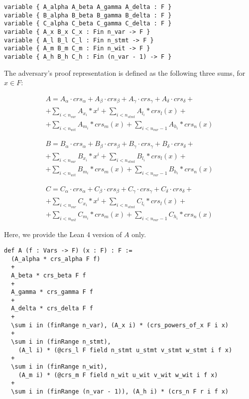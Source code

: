 \documentclass{article}
\theoremstyle{definition}
\theoremstyle{remark}
\begin{document}
\begin{lstlisting}
variable { A_alpha A_beta A_gamma A_delta : F }
variable { B_alpha B_beta B_gamma B_delta : F }
variable { C_alpha C_beta C_gamma C_delta : F }
variable { A_x B_x C_x : Fin n_var -> F }
variable { A_l B_l C_l : Fin n_stmt -> F }
variable { A_m B_m C_m : Fin n_wit -> F }
variable { A_h B_h C_h : Fin (n_var - 1) -> F }
\end{lstlisting}

The adversary's proof representation is defined as the following three sums, for $x \in F$:

\begin{multline}
A = A_{\alpha} \cdot crs_{\alpha} + A_{\beta} \cdot crs_{\beta} + A_{\gamma} \cdot crs_{\gamma} + A_{\delta} \cdot crs_{\delta} + \\
    + \sum \limits_{i < n_{var}} A_{x_i} * x^i + \sum \limits_{i < n_{stmt}} A_{l_i} * crs_l(x) + \\
    + \sum \limits_{i < n_{wit}} A_{m_i} * crs_m(x) + \sum \limits_{i < n_{var} - 1} A_{h_i} * crs_n(x)
\end{multline}

\begin{multline}
B = B_{\alpha} \cdot crs_{\alpha} + B_{\beta} \cdot crs_{\beta} + B_{\gamma} \cdot crs_{\gamma} + B_{\delta} \cdot crs_{\delta} + \\
    + \sum \limits_{i < n_{var}} B_{x_i} * x^i + \sum \limits_{i < n_{stmt}} B_{l_i} * crs_l(x) + \\
    + \sum \limits_{i < n_{wit}} B_{m_i} * crs_m(x) + \sum \limits_{i < n_{var} - 1} B_{h_i} * crs_n(x)
\end{multline}

\begin{multline}
C = C_{\alpha} \cdot crs_{\alpha} + C_{\beta} \cdot crs_{\beta} + C_{\gamma} \cdot crs_{\gamma} + C_{\delta} \cdot crs_{\delta} + \\
    + \sum \limits_{i < n_{var}} C_{x_i} * x^i + \sum \limits_{i < n_{stmt}} C_{l_i} * crs_l(x) + \\
    + \sum \limits_{i < n_{wit}} C_{m_i} * crs_m(x) + \sum \limits_{i < n_{var} - 1} C_{h_i} * crs_n(x)
\end{multline}

Here, we provide the Lean 4 version of $A$ only.

\begin{lstlisting}
def A (f : Vars -> F) (x : F) : F :=
  (A_alpha * crs_alpha F f)
  +
  A_beta * crs_beta F f
  +
  A_gamma * crs_gamma F f
  +
  A_delta * crs_delta F f
  +
  \sum i in (finRange n_var), (A_x i) * (crs_powers_of_x F i x)
  +
  \sum i in (finRange n_stmt),
    (A_l i) * (@crs_l F field n_stmt u_stmt v_stmt w_stmt i f x)
  +
  \sum i in (finRange n_wit),
    (A_m i) * (@crs_m F field n_wit u_wit v_wit w_wit i f x)
  +
  \sum i in (finRange (n_var - 1)), (A_h i) * (crs_n F r i f x)
\end{lstlisting}
\end{document}
